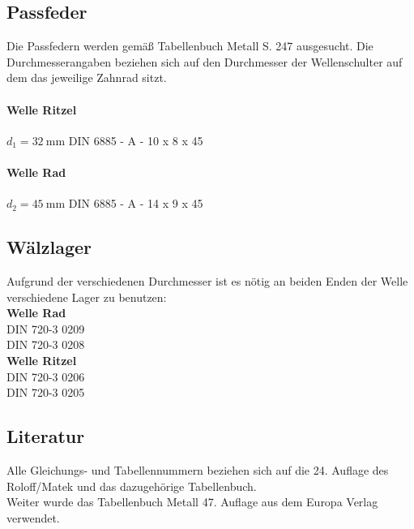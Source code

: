 \documentclass[15pt,a4paper]{article}
\begin{document}
	 	\subsection{Passfeder}
	 		Die Passfedern werden gemäß Tabellenbuch Metall S. 247 ausgesucht. Die Durchmesserangaben beziehen sich auf den Durchmesser der Wellenschulter auf dem das jeweilige Zahnrad sitzt.
	 		\paragraph{Welle Ritzel}
	 			$d_1 = \SI{32}{\milli\m}$
	 			DIN 6885 - A - 10 x 8 x 45
	 		\paragraph{Welle Rad}
		 		$d_2 = \SI{45}{\milli\m}$
		 		DIN 6885 - A - 14 x 9 x 45
		 \subsection{Wälzlager}		
		 	Aufgrund der verschiedenen Durchmesser ist es nötig an beiden Enden der Welle verschiedene Lager zu benutzen:\\
		 		\textbf{Welle Rad}\\
		 			DIN 720-3 0209\\
		 			DIN 720-3 0208\\
		 		\textbf{Welle Ritzel}\\
		 			DIN 720-3 0206\\
		 			DIN 720-3 0205
 		\subsection{Literatur}	
 			Alle Gleichungs- und Tabellennummern beziehen sich auf die 24. Auflage des Roloff/Matek und das dazugehörige Tabellenbuch.\\
 			Weiter wurde das Tabellenbuch Metall 47. Auflage aus dem Europa Verlag verwendet.
 			
\end{document}
